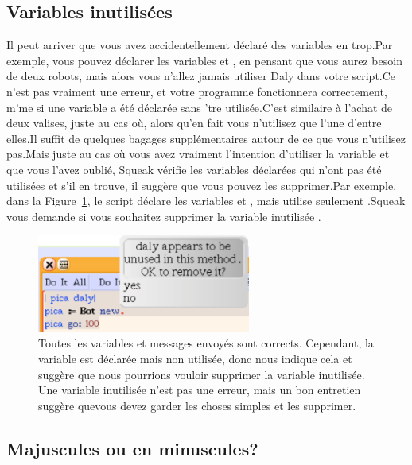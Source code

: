 \documentclass[a4paper,10pt,twoside]{book}
\begin{document}
\subsection{Variables inutilis\'ees}

Il peut arriver que vous avez accidentellement d\'eclar\'e des variables en trop.Par exemple, vous pouvez d\'eclarer les variables  et , en pensant que vous aurez besoin de deux robots, mais alors vous n'allez  jamais utiliser Daly dans votre script.Ce n'est pas vraiment une erreur, et votre programme fonctionnera correctement, m'me si une variable a \'et\'e d\'eclar\'ee sans 'tre utilis\'ee.C'est similaire \`a l'achat de deux valises, juste au cas o\`u, alors qu'en fait vous n'utilisez que l'une d'entre elles.Il suffit de quelques bagages suppl\'ementaires autour de ce que vous n'utilisez pas.Mais juste au cas o\`u vous avez vraiment l'intention d'utiliser la variable  et que vous l'avez oubli\'e, Squeak v\'erifie les variables d\'eclar\'ees qui n'ont pas \'et\'e utilis\'ees et s'il  en trouve, il sugg\`ere que vous pouvez les supprimer.Par exemple, dans la Figure~\ref{fig:unusedVariables}, le script d\'eclare les variables  et , mais utilise seulement .Squeak vous demande si vous souhaitez supprimer la variable inutilis\'ee .

\begin{figure}[h]
\begin{center}\includegraphics[width=7cm]{unusedVariables}
\caption{Toutes les variables et messages envoy\'es sont corrects. Cependant, la variable  est d\'eclar\'ee mais non utilis\'ee, donc \sq nous indique cela et sugg\`ere que nous pourrions vouloir supprimer la variable inutilis\'ee. Une variable inutilis\'ee n'est pas une erreur, mais un bon entretien sugg\`ere quevous devez garder les choses simples et les supprimer.\label{fig:unusedVariables}}\end{center}
\end{figure}

\subsection{Majuscules ou en minuscules?}
\end{document}
